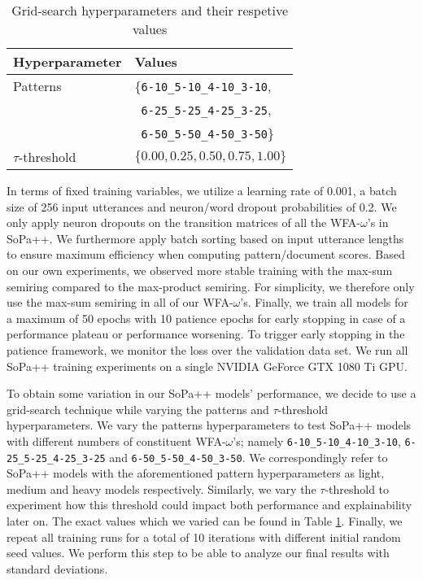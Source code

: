 \begin{table}[t!]
  \centering
  \begin{tabular}{ll}
    \toprule
    Hyperparameter & Values \\
    \midrule
    Patterns & \{\texttt{6-10\_5-10\_4-10\_3-10}, \\
             & ~\texttt{6-25\_5-25\_4-25\_3-25}, \\
             & ~\texttt{6-50\_5-50\_4-50\_3-50}\} \\[10pt]
    $\tau$-threshold & $\{0.00, 0.25, 0.50, 0.75, 1.00\}$ \\
    \bottomrule
  \end{tabular}
  \caption{Grid-search hyperparameters and their respetive values}
  \label{tab:grid_hyperparameter}
\end{table}

In terms of fixed training variables, we utilize a learning rate of 0.001, a
batch size of 256 input utterances and neuron/word dropout probabilities of 0.2.
We only apply neuron dropouts on the transition matrices of all the
WFA-$\omega$'s in SoPa++. We furthermore apply batch sorting based on input
utterance lengths to ensure maximum efficiency when computing pattern/document
scores. Based on our own experiments, we observed more stable training with the
max-sum semiring compared to the max-product semiring. For simplicity, we
therefore only use the max-sum semiring in all of our WFA-$\omega$'s. Finally,
we train all models for a maximum of 50 epochs with 10 patience epochs for early
stopping in case of a performance plateau or performance worsening. To trigger
early stopping in the patience framework, we monitor the loss over the
validation data set. We run all SoPa++ training experiments on a single NVIDIA
GeForce GTX 1080 Ti GPU.

To obtain some variation in our SoPa++ models' performance, we decide to use a
grid-search technique while varying the patterns and $\tau$-threshold
hyperparameters. We vary the patterns hyperparameters to test SoPa++ models with
different numbers of constituent WFA-$\omega$'s; namely
\texttt{6-10\_5-10\_4-10\_3-10}, \texttt{6-25\_5-25\_4-25\_3-25} and
\texttt{6-50\_5-50\_4-50\_3-50}. We correspondingly refer to SoPa++ models with
the aforementioned pattern hyperparameters as light, medium and heavy models
respectively. Similarly, we vary the $\tau$-threshold to experiment how this
threshold could impact both performance and explainability later on. The exact
values which we varied can be found in Table \ref{tab:grid_hyperparameter}.
Finally, we repeat all training runs for a total of 10 iterations with different
initial random seed values. We perform this step to be able to analyze our final
results with standard deviations.

